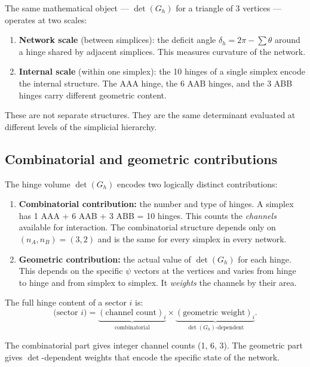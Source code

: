 \documentclass[12pt]{article}
\theoremstyle{remark}
\theoremstyle{definition}
\begin{document}
The same mathematical object --- $\det(G_h)$ for a triangle of 3 vertices --- operates at two scales:

\begin{enumerate}
\item \textbf{Network scale} (between simplices): the deficit angle $\delta_h = 2\pi - \sum\theta$ around a hinge shared by adjacent simplices. This measures curvature of the network.
\item \textbf{Internal scale} (within one simplex): the 10 hinges of a single simplex encode the internal structure. The AAA hinge, the 6 AAB hinges, and the 3 ABB hinges carry different geometric content.
\end{enumerate}

These are not separate structures. They are the same determinant evaluated at different levels of the simplicial hierarchy.

\subsection{Combinatorial and geometric contributions}
\label{sec:comb_vs_geom}

The hinge volume $\det(G_h)$ encodes two logically distinct contributions:

\begin{enumerate}
\item \textbf{Combinatorial contribution:} the number and type of hinges. A simplex has 1 AAA + 6 AAB + 3 ABB = 10 hinges. This counts the \emph{channels} available for interaction. The combinatorial structure depends only on $(n_A, n_B) = (3, 2)$ and is the same for every simplex in every network.

\item \textbf{Geometric contribution:} the actual value of $\det(G_h)$ for each hinge. This depends on the specific $\psi$ vectors at the vertices and varies from hinge to hinge and from simplex to simplex. It \emph{weights} the channels by their area.
\end{enumerate}

The full hinge content of a sector $i$ is:
\begin{equation}
\text{(sector $i$)} = \underbrace{(\text{channel count})_i}_{\text{combinatorial}} \times \underbrace{(\text{geometric weight})_i}_{\det(G_h)\text{-dependent}}.
\end{equation}

The combinatorial part gives integer channel counts (1, 6, 3). The geometric part gives $\det$-dependent weights that encode the specific state of the network.
\end{document}
